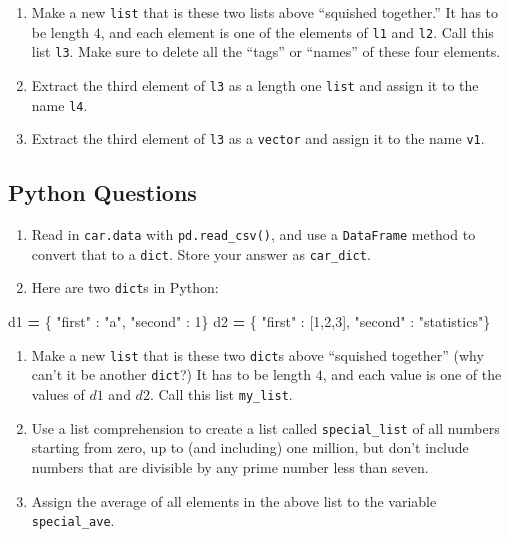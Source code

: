 \documentclass[12pt,krantz2]{krantz}
\makeatletter
\newenvironment{Shaded}{\begin{snugshade}}{\end{snugshade}}
\newcommand{\DecValTok}[1]{\textcolor[rgb]{0.06,0.06,0.06}{#1}}
\newcommand{\NormalTok}[1]{#1}
\newcommand{\OperatorTok}[1]{\textcolor[rgb]{0.43,0.43,0.43}{\textbf{#1}}}
\newcommand{\StringTok}[1]{\textcolor[rgb]{0.5,0.5,0.5}{#1}}
\newenvironment{kframe}{%
\medskip{}
\setlength{\fboxsep}{.8em}
 \def\at@end@of@kframe{}%
 \ifinner\ifhmode%
  \def\at@end@of@kframe{\end{minipage}}%
  \begin{minipage}{\columnwidth}%
 \fi\fi%
 \def\FrameCommand##1{\hskip\@totalleftmargin \hskip-\fboxsep
 \colorbox{shadecolor}{##1}\hskip-\fboxsep
     \hskip-\linewidth \hskip-\@totalleftmargin \hskip\columnwidth}%
 \MakeFramed {\advance\hsize-\width
   \@totalleftmargin\z@ \linewidth\hsize
   \@setminipage}}%
 {\par\unskip\endMakeFramed%
 \at@end@of@kframe}
\renewenvironment{Shaded}{\begin{kframe}}{\end{kframe}}
\makeatother
\begin{document}
\begin{enumerate}
\def\labelenumi{\alph{enumi}.}
\item
  Make a new \texttt{list} that is these two lists above ``squished together.'' It has to be length \(4\), and each element is one of the elements of \texttt{l1} and \texttt{l2}. Call this list \texttt{l3}. Make sure to delete all the ``tags'' or ``names'' of these four elements.
\item
  Extract the third element of \texttt{l3} as a length one \texttt{list} and assign it to the name \texttt{l4}.
\item
  Extract the third element of \texttt{l3} as a \texttt{vector} and assign it to the name \texttt{v1}.
\end{enumerate}

\hypertarget{python-questions-3}{%
\subsection{Python Questions}\label{python-questions-3}}

\begin{enumerate}
\def\labelenumi{\arabic{enumi}.}
\item
  Read in \texttt{car.data} with \texttt{pd.read\_csv()}, and use a \texttt{DataFrame} method to convert that to a \texttt{dict}. Store your answer as \texttt{car\_dict}.
\item
  Here are two \texttt{dict}s in Python:
\end{enumerate}

\begin{Shaded}
\begin{Highlighting}[]
\NormalTok{d1 }\OperatorTok{=}\NormalTok{ \{ }\StringTok{"first"}\NormalTok{ : }\StringTok{"a"}\NormalTok{, }\StringTok{"second"}\NormalTok{ : }\DecValTok{1}\NormalTok{\}}
\NormalTok{d2 }\OperatorTok{=}\NormalTok{ \{ }\StringTok{"first"}\NormalTok{ : [}\DecValTok{1}\NormalTok{,}\DecValTok{2}\NormalTok{,}\DecValTok{3}\NormalTok{], }\StringTok{"second"}\NormalTok{ : }\StringTok{"statistics"}\NormalTok{\}}
\end{Highlighting}
\end{Shaded}

\begin{enumerate}
\def\labelenumi{\alph{enumi}.}
\item
  Make a new \texttt{list} that is these two \texttt{dict}s above ``squished together'' (why can't it be another \texttt{dict}?) It has to be length \(4\), and each value is one of the values of \(d1\) and \(d2\). Call this list \texttt{my\_list}.
\item
  Use a list comprehension to create a list called \texttt{special\_list} of all numbers starting from zero, up to (and including) one million, but don't include numbers that are divisible by any prime number less than seven.
\item
  Assign the average of all elements in the above list to the variable \texttt{special\_ave}.
\end{enumerate}
\end{document}
